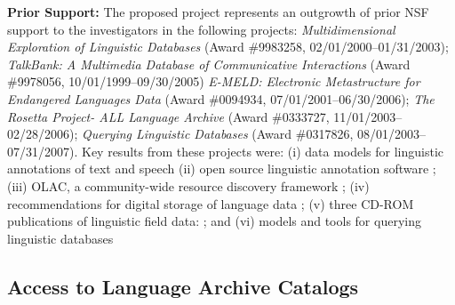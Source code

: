 \textbf{Prior Support:} The proposed project represents an outgrowth of
prior NSF support to the investigators in the following projects:
\textit{Multidimensional Exploration of Linguistic Databases}
  (Award \#9983258, 02/01/2000--01/31/2003);
\textit{TalkBank: A Multimedia Database of Communicative Interactions}
  (Award \#9978056, 10/01/1999--09/30/2005)
\textit{E-MELD: Electronic Metastructure for Endangered Languages Data}
  (Award \#0094934, 07/01/2001--06/30/2006);
\textit{The Rosetta Project- ALL Language Archive}
  (Award \#0333727, 11/01/2003--02/28/2006);
\textit{Querying Linguistic Databases}
  (Award \#0317826, 08/01/2003--07/31/2007).
Key results from these projects were:
(i) data models for linguistic annotations of text and speech
\citep{BirdLiberman01,MaedaBird00,GraffBird00,CottonBird02,CieriBird01,ATLAS00,BirdHarrington01}
(ii) open source linguistic annotation software
\citep{Bird01acl,MaedaBird02,BirdMaeda02,MaLee02};
(iii) OLAC, a community-wide resource discovery framework
\citep{BirdSimons00,BirdSimons00survey,BirdSimons01,BirdSimons02workshop,Simons02query,SimonsBird03lht,BirdSimons03chum,Simons03display,SimonsBird03llc,BirdSimons04metadata};
(iv) recommendations for digital storage of language data
\citep{BirdSimons03language};
(v) three CD-ROM publications of linguistic field data:
\citep{BirdBell01,Bird03paradigms,Bird03ngomba};
and
(vi) models and tools for querying linguistic databases
\citep{BirdBuneman01,BirdBunemanTan00,LaiBird04,Bird05planx,Bird06icde}


\subsection{Access to Language Archive Catalogs}


